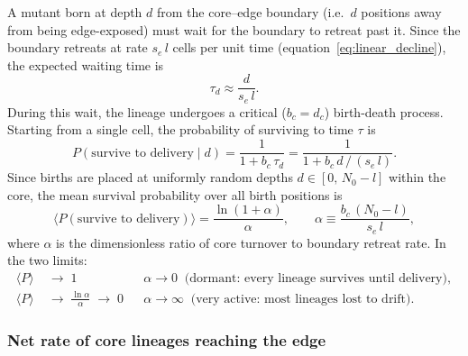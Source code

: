 \documentclass[12pt]{article}
\newcommand{\Nzero}{N_0}
\newcommand{\sEdge}{s_e}
\newcommand{\bCore}{b_c}
\newcommand{\dCore}{d_c}
\begin{document}
A mutant born at depth $d$ from the core--edge boundary (i.e.\ $d$
positions away from being edge-exposed) must wait for the boundary to
retreat past it. Since the boundary retreats at rate $\sEdge\,l$ cells
per unit time (equation~\eqref{eq:linear_decline}), the expected waiting
time is
\begin{equation}
    \tau_d \approx \frac{d}{\sEdge\,l}.
    \label{eq:delivery_time}
\end{equation}
During this wait, the lineage undergoes a critical ($\bCore = \dCore$)
birth-death process. Starting from a single cell, the probability of
surviving to time $\tau$ is \cite{athreya1972}
\begin{equation}
    P(\text{survive to delivery} \mid d)
    = \frac{1}{1 + \bCore\,\tau_d}
    = \frac{1}{1 + \bCore\,d\,/\,(\sEdge\,l)}.
    \label{eq:survival_prob}
\end{equation}
Since births are placed at uniformly random depths $d \in [0,\,\Nzero - l]$
within the core, the mean survival probability over all birth positions is
\begin{equation}
    \langle P(\text{survive to delivery}) \rangle
    = \frac{\ln(1 + \alpha)}{\alpha}, \qquad
    \alpha \equiv \frac{\bCore\,(\Nzero - l)}{\sEdge\,l},
    \label{eq:mean_survival}
\end{equation}
where $\alpha$ is the dimensionless ratio of core turnover to boundary
retreat rate. In the two limits:
\begin{align}
    \langle P \rangle &\;\to\; 1
        && \alpha \to 0
        \;\;\text{(dormant: every lineage survives until delivery)},
        \label{eq:dormant_survival}\\[4pt]
    \langle P \rangle &\;\to\; \frac{\ln\alpha}{\alpha} \;\to\; 0
        && \alpha \to \infty
        \;\;\text{(very active: most lineages lost to drift)}.
        \label{eq:active_survival}
\end{align}

\subsubsection*{Net rate of core lineages reaching the edge}
\end{document}
